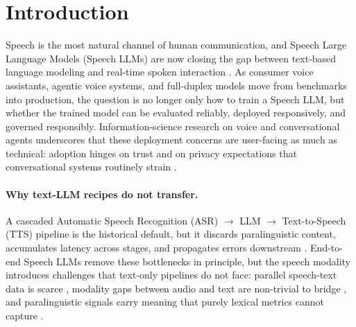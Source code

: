 \section{Introduction}
\label{sec:introduction}

Speech is the most natural channel of human communication, and Speech
Large Language Models (Speech LLMs) are now closing the gap between
text-based language modeling and real-time spoken interaction
\citep{chen2023salmspeechaugmentedlanguagemodel,
luo2025openomniadvancingopensourceomnimodal}. As consumer voice
assistants, agentic voice systems, and full-duplex models move from
benchmarks into production, the question is no longer only how to
train a Speech LLM, but whether the trained model can be evaluated
reliably, deployed responsively, and governed responsibly. Information-science
research on voice and conversational agents underscores that these
deployment concerns are user-facing as much as technical: adoption hinges
on trust \citep{zhan2024healthcare} and on privacy expectations that
conversational systems routinely strain \citep{gumusel2024privacy}.

\paragraph{Why text-LLM recipes do not transfer.}
A cascaded Automatic Speech Recognition (ASR) $\rightarrow$ LLM
$\rightarrow$ Text-to-Speech (TTS) pipeline is the historical default,
but it discards paralinguistic content, accumulates latency across
stages, and propagates errors downstream
\citep{cui2024recent,agrawal2025spokenlanguageunderstandingunseen,
defossez2024moshi}. End-to-end Speech LLMs
remove these bottlenecks in principle, but the speech modality
introduces challenges that text-only pipelines do not face:
parallel speech-text data is scarce
\citep{communication2023seamlessmultilingualexpressivestreaming},
modality gaps between audio and text are
non-trivial to bridge
\citep{defossez2024moshi}, and paralinguistic
signals carry meaning that purely lexical metrics cannot capture
\citep{zhang2023speechgptempoweringlargelanguage}.

